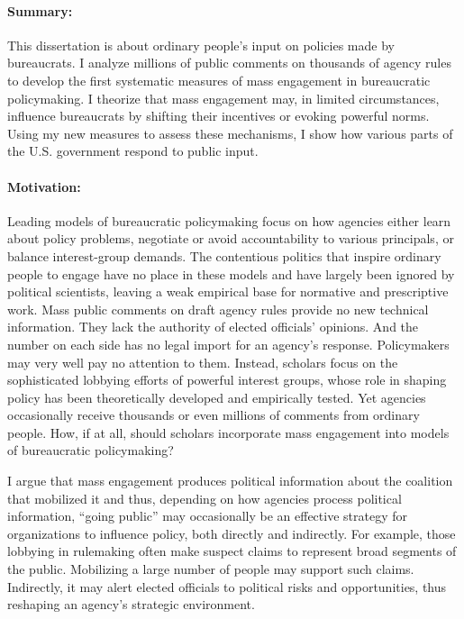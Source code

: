 
\paragraph{Summary:} This dissertation is about ordinary people's input on policies made by bureaucrats. 
I analyze millions of public comments on thousands of agency rules to develop the first systematic measures of mass engagement in bureaucratic policymaking. 
I theorize that mass engagement may, in limited circumstances, influence bureaucrats by shifting their incentives or evoking powerful norms. Using my new measures to assess these mechanisms, 
I show how various parts of the U.S. government respond to public input.  %

\paragraph{Motivation:} 



Leading models of bureaucratic policymaking focus on how agencies either learn about policy problems, negotiate or avoid accountability to various principals, or balance interest-group demands.
The contentious politics that inspire ordinary people to engage have no place in these models and have largely been ignored by political scientists, leaving a weak empirical base for normative and prescriptive work. 
Mass public comments on draft agency rules provide no new technical information. 
They lack the authority of elected officials' opinions. 
And the number on each side has no legal import for an agency's response.
Policymakers may very well pay no attention to them. 
Instead, scholars focus on the sophisticated lobbying efforts of powerful interest groups, whose role in shaping policy has been theoretically developed and empirically tested.
Yet agencies occasionally receive thousands or even millions of comments from ordinary people. %
How, if at all, should scholars incorporate mass engagement into models of bureaucratic policymaking? 

I argue that mass engagement produces political information about the coalition that mobilized it and thus, depending on how agencies process political information, ``going public'' may occasionally be an effective strategy for organizations to influence policy, both directly and indirectly.
For example, those lobbying in rulemaking often make suspect claims to represent broad segments of the public. Mobilizing a large number of people may support such claims.
Indirectly, it may alert elected officials to political risks and opportunities, thus reshaping an agency's strategic environment.

